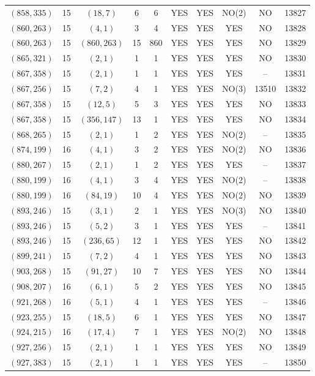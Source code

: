 \begin{longtable}{|c|c|c|c|c|c|c|c|c|c|}
$(858, 335)$ & 15 & $(18, 7)$ & 6 & 6 & YES & YES & NO(2) & NO & 13827\\
$(860, 263)$ & 15 & $(4, 1)$ & 3 & 4 & YES & YES & YES & NO & 13828\\
$(860, 263)$ & 15 & $(860, 263)$ & 15 & 860 & YES & YES & YES & NO & 13829\\
$(865, 321)$ & 15 & $(2, 1)$ & 1 & 1 & YES & YES & YES & NO & 13830\\
$(867, 358)$ & 15 & $(2, 1)$ & 1 & 1 & YES & YES & YES & -- & 13831\\
$(867, 256)$ & 15 & $(7, 2)$ & 4 & 1 & YES & YES & NO(3) & 13510 & 13832\\
$(867, 358)$ & 15 & $(12, 5)$ & 5 & 3 & YES & YES & YES & NO & 13833\\
$(867, 358)$ & 15 & $(356, 147)$ & 13 & 1 & YES & YES & YES & NO & 13834\\
$(868, 265)$ & 15 & $(2, 1)$ & 1 & 2 & YES & YES & NO(2) & -- & 13835\\
$(874, 199)$ & 16 & $(4, 1)$ & 3 & 2 & YES & YES & NO(2) & NO & 13836\\
$(880, 267)$ & 15 & $(2, 1)$ & 1 & 2 & YES & YES & YES & -- & 13837\\
$(880, 199)$ & 16 & $(4, 1)$ & 3 & 4 & YES & YES & NO(2) & -- & 13838\\
$(880, 199)$ & 16 & $(84, 19)$ & 10 & 4 & YES & YES & NO(2) & NO & 13839\\
$(893, 246)$ & 15 & $(3, 1)$ & 2 & 1 & YES & YES & NO(3) & NO & 13840\\
$(893, 246)$ & 15 & $(5, 2)$ & 3 & 1 & YES & YES & YES & -- & 13841\\
$(893, 246)$ & 15 & $(236, 65)$ & 12 & 1 & YES & YES & YES & NO & 13842\\
$(899, 241)$ & 15 & $(7, 2)$ & 4 & 1 & YES & YES & YES & NO & 13843\\
$(903, 268)$ & 15 & $(91, 27)$ & 10 & 7 & YES & YES & YES & NO & 13844\\
$(908, 207)$ & 16 & $(6, 1)$ & 5 & 2 & YES & YES & YES & NO & 13845\\
$(921, 268)$ & 16 & $(5, 1)$ & 4 & 1 & YES & YES & YES & -- & 13846\\
$(923, 255)$ & 15 & $(18, 5)$ & 6 & 1 & YES & YES & YES & NO & 13847\\
$(924, 215)$ & 16 & $(17, 4)$ & 7 & 1 & YES & YES & NO(2) & NO & 13848\\
$(927, 256)$ & 15 & $(2, 1)$ & 1 & 1 & YES & YES & YES & NO & 13849\\
$(927, 383)$ & 15 & $(2, 1)$ & 1 & 1 & YES & YES & YES & -- & 13850\\

\end{longtable}
